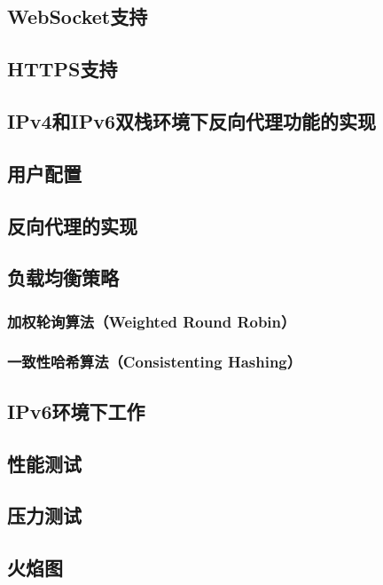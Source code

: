 \documentclass[twoside]{CUGThesis}
\begin{document}
	\subsection{WebSocket支持}

	\subsection{HTTPS支持}

	

	\begin{spacing}{2}
		\section{IPv4和IPv6双栈环境下反向代理功能的实现}
	\end{spacing}
	\subsection{用户配置}
	\subsection{反向代理的实现}
	\subsection{负载均衡策略}
	\subsubsection{加权轮询算法（Weighted Round Robin）}
	\subsubsection{一致性哈希算法（Consistenting Hashing）}
	\subsection{IPv6环境下工作}

	\begin{spacing}{2}
		\section{性能测试}
	\end{spacing}
	\subsection{压力测试}

	\subsection{火焰图}
	
\end{document}
